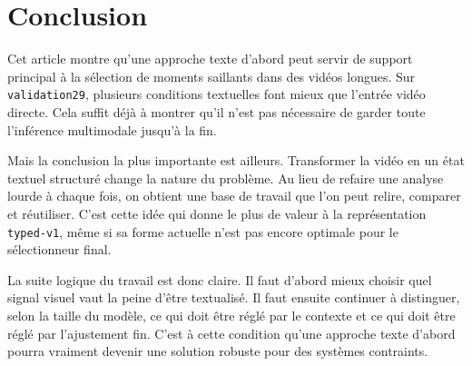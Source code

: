 \section{Conclusion}

Cet article montre qu'une approche texte d'abord peut servir de support principal \`a la s\'election de moments saillants dans des vid\'eos longues. Sur \texttt{validation29}, plusieurs conditions textuelles font mieux que l'entr\'ee vid\'eo directe. Cela suffit d\'ej\`a \`a montrer qu'il n'est pas n\'ecessaire de garder toute l'inf\'erence multimodale jusqu'\`a la fin.

Mais la conclusion la plus importante est ailleurs. Transformer la vid\'eo en un \'etat textuel structur\'e change la nature du probl\`eme. Au lieu de refaire une analyse lourde \`a chaque fois, on obtient une base de travail que l'on peut relire, comparer et r\'eutiliser. C'est cette id\'ee qui donne le plus de valeur \`a la repr\'esentation \texttt{typed-v1}, m\^eme si sa forme actuelle n'est pas encore optimale pour le s\'electionneur final.

La suite logique du travail est donc claire. Il faut d'abord mieux choisir quel signal visuel vaut la peine d'\^etre textualis\'e. Il faut ensuite continuer \`a distinguer, selon la taille du mod\`ele, ce qui doit \^etre r\'egl\'e par le contexte et ce qui doit \^etre r\'egl\'e par l'ajustement fin. C'est \`a cette condition qu'une approche texte d'abord pourra vraiment devenir une solution robuste pour des syst\`emes contraints.
